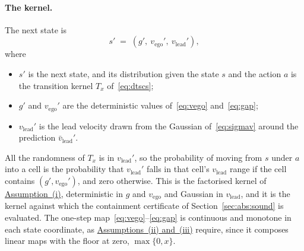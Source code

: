 \documentclass[11pt,a4paper]{article}
\newcommand{\vego}{v_{\text{ego}}}
\newcommand{\vlead}{v_{\text{lead}}}
\theoremstyle{plain}
\theoremstyle{remark}
\begin{document}
	\paragraph{The kernel.}
	The next state is
	\begin{equation}
		s' \;=\; (g',\ \vego',\ \vlead'),
		\label{eq:kernel}
	\end{equation}
	where
	\begin{itemize}
		\item $s'$ is the next state, and its distribution given the state $s$ and the action $a$ is the transition kernel $T_x$ of~\eqref{eq:dtscs};
		\item $g'$ and $\vego'$ are the deterministic values of~\eqref{eq:vego} and~\eqref{eq:gap};
		\item $\vlead'$ is the lead velocity drawn from the Gaussian of~\eqref{eq:sigmav} around the prediction $\bar{v}_{\text{lead}}'$.
	\end{itemize}
	All the randomness of $T_x$ is in $\vlead'$, so the probability of moving from $s$ under $a$ into a cell is the probability that $\vlead'$ falls in that cell's $\vlead$ range if the cell contains $(g', \vego')$, and zero otherwise. This is the factorised kernel of \hyperref[ass:sysclass]{Assumption~(i)}, deterministic in $g$ and $\vego$ and Gaussian in $\vlead$, and it is the kernel against which the containment certificate of Section~\ref{sec:abs:sound} is evaluated. The one-step map~\eqref{eq:vego}--\eqref{eq:gap} is continuous and monotone in each state coordinate, as \hyperref[ass:sysclass]{Assumptions~(ii) and~(iii)} require, since it composes linear maps with the floor at zero, $\max\{0, x\}$.
	
\end{document}
